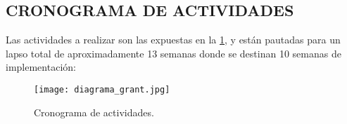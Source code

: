 
\subsection{CRONOGRAMA DE ACTIVIDADES}

    Las actividades a realizar son las expuestas en la \ref{cronograma2}, y están pautadas para un
    lapso total de aproximadamente 13 semanas donde se destinan 10 semanas de
    implementación:

    \begin{figure}[htb]
		\centering

		\texttt{[image: diagrama\_grant.jpg]}
        \caption{Cronograma de actividades.}
		\label{cronograma2}
	\end{figure}

